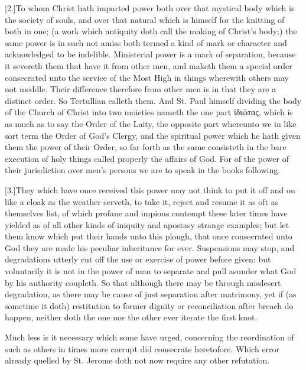 [2.]To whom Christ hath imparted power both over that mystical body which is the society of souls, and over that natural which is himself for the knitting of both in one; (a work which antiquity doth call the making of Christ’s body;) the same power is in such not amiss both termed a kind of mark or character and acknowledged to be indelible. Ministerial power is a mark of separation, because it severeth them that have it from other men, and maketh them a special order consecrated unto the service of the Most High in things wherewith others may not meddle. Their difference therefore from other men is in that they are a distinct order. So Tertullian calleth them. And St. Paul himself dividing the body of the Church of Christ into two moieties nameth the one part ἰδιώτας, which is as much as to say the Order of the Laity, the opposite part whereunto we in like sort term the Order of God’s Clergy, and the spiritual power which he hath given them the power of their Order, so far forth as the same consisteth in the bare execution of holy things called properly the affairs of God. For of the power of their  jurisdiction over men’s persons we are to speak in the books following.

[3.]They which have once received this power may not think to put it off and on like a cloak as the weather serveth, to take it, reject and resume it as oft as themselves list, of which profane and impious contempt these later times have yielded as of all other kinds of iniquity and apostasy strange examples; but let them know which put their hands unto this plough, that once consecrated unto God they are made his peculiar inheritance for ever. Suspensions may stop, and degradations utterly cut off the use or exercise of power before given: but voluntarily it is not in the power of man to separate and pull asunder what God by his authority coupleth. So that although there may be through misdesert degradation, as there may be cause of just separation after matrimony, yet if (as sometime it doth) restitution to former dignity or reconciliation after breach do happen, neither doth the one nor the other ever iterate the first knot.

Much less is it necessary which some have urged, concerning the reordination of such as others in times more corrupt did consecrate heretofore. Which error already quelled by St. Jerome doth not now require any other refutation.

